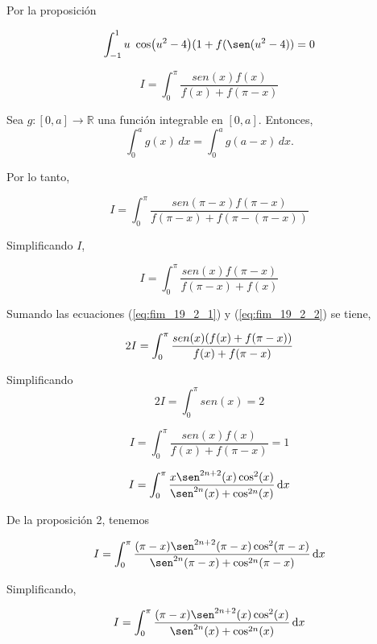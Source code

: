 { Por la proposición
\begin{LnxRptaBox}
	$$
	 \int_{-1}^1 u\ \cos(u^2-4)(1+f(\sen(u^2-4)) = 0 
	$$
\end{LnxRptaBox}


\begin{equation}
I=  \int_{0}^{\pi} \frac{sen(x)f(x)}{f(x)+f(\pi-x)}	
\label{eq:fim_19_2_1}
\end{equation}


\begin{proposicion}
	Sea \( g: [0,a] \to \mathbb{R} \) una función integrable en \([0,a]\). Entonces,
	\[
	\int_0^a g(x) \,dx = \int_0^a g(a-x) \,dx.
	\]
\end{proposicion}

Por lo tanto,

$$
I=  \int_{0}^{\pi} \frac{sen(\pi-x)f(\pi-x)}{f(\pi-x)+f(\pi-(\pi-x))}
$$

Simplificando  $I$,

\begin{equation}
I=  \int_{0}^{\pi} \frac{sen(x)f(\pi-x)}{f(\pi-x)+f(x)}
\label{eq:fim_19_2_2}
\end{equation}

Sumando las ecuaciones (\ref{eq:fim_19_2_1}) y  (\ref{eq:fim_19_2_2}) se tiene,

$$
2I=  \int_{0}^{\pi} \frac{sen(x)\pqty{f(x)+f(\pi-x)} }{f(x)+f(\pi-x)}
$$

Simplificando
$$
2I=  \int_{0}^{\pi} sen(x)=2
$$

\begin{LnxRptaBox}
	$$
	I= \int_{0}^{\pi} \frac{sen(x)f(x)}{f(x)+f(\pi-x)}	=  1
	$$
\end{LnxRptaBox}

\begin{equation}
	I=  \int_{0}^{\pi} \frac{x \sen^{2n+2}(x) \cos^2 (x) }{  \sen^{2n}(x) +\cos^{2n}(x)} \dd{x}
	\label{eq:fim_19_2_3}
\end{equation}

De la proposición 2, tenemos

$$
I=  \int_{0}^{\pi} \frac{(\pi-x) \sen^{2n+2}(\pi-x) \cos^2 (\pi-x) }{  \sen^{2n}(\pi-x) +\cos^{2n}(\pi-x)} \dd{x}
$$

Simplificando,

\begin{equation}
	I=  \int_{0}^{\pi} \frac{(\pi-x) \sen^{2n+2}(x) \cos^2 (x) }{  \sen^{2n}(x) +\cos^{2n}(x)}\dd{x}
	\label{eq:fim_19_2_4}
\end{equation}

}
